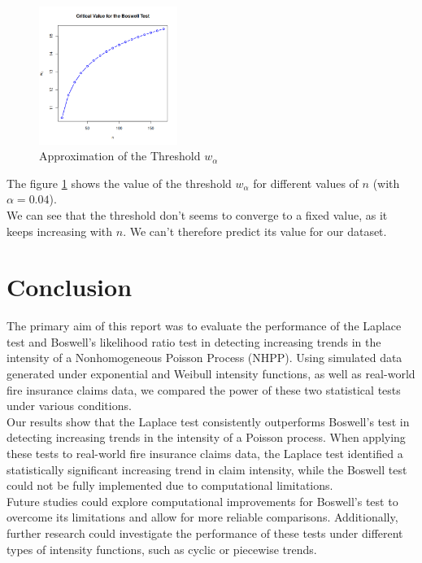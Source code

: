 \documentclass{journalstyle}
\begin{document}
\begin{figure}[H]
    \centering
    \includegraphics[width=0.4\textwidth]{src/walpha_approximation.png}
    \caption{Approximation of the Threshold $w_{\alpha}$}
    \label{fig:walpha_approximation}
\end{figure}

The figure \ref{fig:walpha_approximation} shows the value of the threshold $w_{\alpha}$ for different values of $n$ (with $\alpha = 0.04$). \\
We can see that the threshold don't seems to converge to a fixed value, as it keeps increasing with $n$.
We can't therefore predict its value for our dataset.


\section{Conclusion}
The primary aim of this report was to evaluate the performance of the Laplace test and Boswell's likelihood ratio test in detecting increasing trends in the intensity of a Nonhomogeneous Poisson Process (NHPP).
Using simulated data generated under exponential and Weibull intensity functions, as well as real-world fire insurance claims data, we compared the power of these two statistical tests under various conditions. \\
Our results show that the Laplace test consistently outperforms Boswell's test in detecting increasing trends in the intensity of a Poisson process.
When applying these tests to real-world fire insurance claims data, the Laplace test identified a statistically significant increasing trend in claim intensity, while the Boswell test could not be fully implemented due to computational limitations. \\
Future studies could explore computational improvements for Boswell's test to overcome its limitations and allow for more reliable comparisons.
Additionally, further research could investigate the performance of these tests under different types of intensity functions, such as cyclic or piecewise trends.
\end{document}
